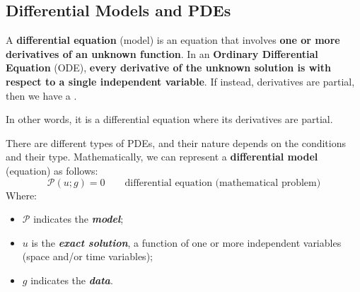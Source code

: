 \subsection{Differential Models and PDEs}

\begin{definitionbox}
    A \textbf{differential equation} (model) is an equation that involves \textbf{one or more derivatives of an unknown function}. In an \textbf{Ordinary Differential Equation} (ODE), \textbf{every derivative of the unknown solution is with respect to a single independent variable}. If instead, derivatives are partial, then we have a .
\end{definitionbox}

\noindent
In other words, it is a differential equation where its derivatives are partial.

\highspace
There are different types of PDEs, and their nature depends on the conditions and their type. Mathematically, we can represent a \textbf{differential model} (equation) as follows:
\begin{equation}
    \mathcal{P}\left(u; g\right) = 0 \hspace{2em} \text{differential equation (mathematical problem)}
\end{equation}
Where:
\begin{itemize}
    \item $\mathcal{P}$ indicates the \emph{\textbf{model}};
    \item $u$ is the \emph{\textbf{exact solution}}, a function of one or more independent variables (space and/or time variables);
    \item $g$ indicates the \emph{\textbf{data}}.
\end{itemize}

